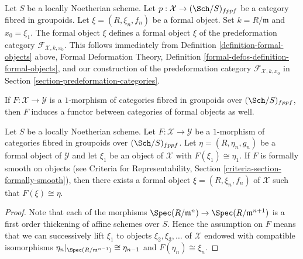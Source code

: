 \begin{remark}
\label{remark-formal-objects-match}
Let $S$ be a locally Noetherian scheme. Let
$p : \mathcal{X} \to (\Sch/S)_{fppf}$ be a category fibred in groupoids.
Let $\xi = (R, \xi_n, f_n)$ be a formal object. Set $k = R/\mathfrak m$ and
$x_0 = \xi_1$. The formal object $\xi$ defines a formal object
$\xi$ of the predeformation category $\mathcal{F}_{\mathcal{X}, k, x_0}$.
This follows immediately from
Definition \ref{definition-formal-objects} above,
Formal Deformation Theory, Definition
\ref{formal-defos-definition-formal-objects},
and our construction of the predeformation category
$\mathcal{F}_{\mathcal{X}, k, x_0}$ in
Section \ref{section-predeformation-categories}.
\end{remark}

\noindent
If $F : \mathcal{X} \to \mathcal{Y}$ is a $1$-morphism of categories fibred
in groupoids over $(\Sch/S)_{fppf}$, then $F$ induces a functor between
categories of formal objects as well.

\begin{lemma}
\label{lemma-smooth-lift-formal}
Let $S$ be a locally Noetherian scheme. Let $F : \mathcal{X} \to \mathcal{Y}$
be a $1$-morphism of categories fibred in groupoids over $(\Sch/S)_{fppf}$.
Let $\eta = (R, \eta_n, g_n)$ be a formal object of $\mathcal{Y}$
and let $\xi_1$ be an object of $\mathcal{X}$ with $F(\xi_1) \cong \eta_1$.
If $F$ is formally smooth on objects (see
Criteria for Representability, Section \ref{criteria-section-formally-smooth}),
then there exists a formal object $\xi = (R, \xi_n, f_n)$ of $\mathcal{X}$
such that $F(\xi) \cong \eta$.
\end{lemma}

\begin{proof}
Note that each of the morphisms
$\Spec(R/\mathfrak m^n) \to \Spec(R/\mathfrak m^{n + 1})$ is a first order
thickening of affine schemes over $S$. Hence the assumption on $F$ means
that we can successively lift $\xi_1$ to objects $\xi_2, \xi_3, \ldots$
of $\mathcal{X}$ endowed with compatible isomorphisms
$\eta_n|_{\Spec(R/\mathfrak m^{n - 1})} \cong \eta_{n - 1}$
and $F(\eta_n) \cong \xi_n$.
\end{proof}

